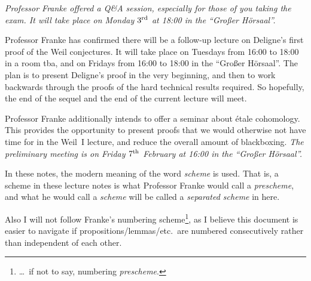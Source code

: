 \documentclass[a4paper, 10pt, oneside, DIV=9, chapterprefix=true, numbers=enddot, bibliography=totoc]{scrbook}
\DeclareRobustCommand{\Attention}{\tikz[baseline, anchor=base]\node[draw, regular polygon, regular polygon sides=3, rounded corners=2, thick, inner sep=-0.25pt] at (0,0) {\textbf{!}};}
\begin{document}
\emph{Professor Franke offered a Q\&A session, especially for those of you taking the exam. It will take place on Monday $3^{\text{rd}}$ at 18:00 in the \enquote{Großer Hörsaal}.}

Professor Franke has confirmed there will be a follow-up lecture on Deligne's first proof of the Weil conjectures. It will take place on Tuesdays from 16:00 to 18:00 in a room tba, and on Fridays from  16:00 to 18:00 in the \enquote{Großer Hörsaal}. The plan is to present Deligne's proof in the very beginning, and then to work backwards through the proofs of the hard technical results required. So hopefully, the end of the sequel and the end of the current lecture will meet.

Professor Franke additionally intends to offer a seminar about étale cohomology. This provides the opportunity to present proofs that we would otherwise not have time for in the Weil~I lecture, and reduce the overall amount of blackboxing. \emph{The preliminary meeting is on Friday $7^{\text{th}}$ February at 16:00 in the \enquote{Großer Hörsaal}.}

In these notes, the modern meaning of the word \emph{scheme} is used. That is, a scheme in these lecture notes is what Professor Franke would call a \emph{prescheme}, and what he would call a \emph{scheme} will be called a \emph{separated scheme} in here.

Also I will not follow Franke's numbering scheme\footnote{\ldots\ if not to say, numbering \emph{prescheme}.}, as I believe this document is easier to navigate if propositions/lemmas/etc.\ are numbered consecutively rather than independent of each other. 


\mainmatter{}




\end{document}
